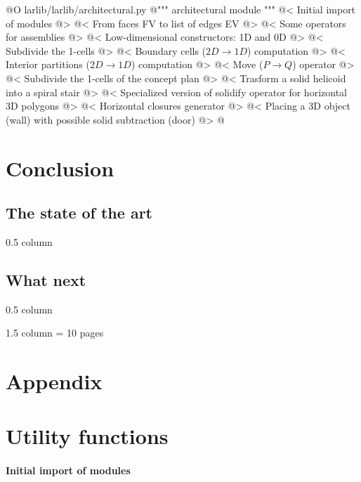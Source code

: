 \documentclass[11pt,oneside]{article}    %
\begin{document}
@O larlib/larlib/architectural.py
@{""" architectural module """
@< Initial import of modules @>
@< From faces FV to list of edges EV @>
@< Some operators for assemblies @>
@< Low-dimensional constructors: 1D and 0D @>
@< Subdivide the 1-cells @>
@< Boundary cells ($2D\to 1D$) computation @>
@< Interior partitions ($2D\to 1D$) computation @>
@< Move ($P\to Q$) operator @>
@< Subdivide the 1-cells of the concept plan @>
@< Trasform a solid helicoid into a spiral stair @>
@< Specialized version of solidify operator for horizontal 3D polygons @>
@< Horizontal closures generator @>
@< Placing a 3D object (wall) with possible solid subtraction (door) @>
@}
\section{Conclusion}\label{sec:conclusion}
\subsection{The state of the art}
0.5 column
\subsection{What next}
0.5 column



1.5 column
= 10 pages

\appendix
\section{Appendix}
\section{Utility functions}

\paragraph{Initial import of modules}
\end{document}
